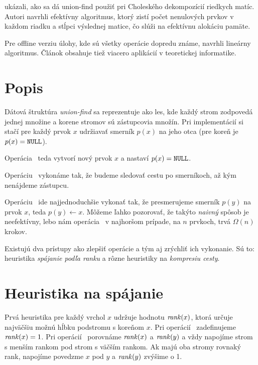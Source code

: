 \citet{cholesky} ukázali, ako sa dá union-find použiť pri Choleského dekompozícií
riedkych matíc. Autori navrhli efektívny algoritmus, ktorý zistí počet nenulových
prvkov v každom riadku a stĺpci výslednej matice, čo slúži na efektívnu alokáciu
pamäte.

Pre offline verziu úlohy, kde sú všetky operácie dopredu známe, \citet{offline-uf}
navrhli lineárny algoritmus. Článok obsahuje tiež viacero aplikácií v teoretickej
informatike.


\section{Popis}
Dátová štruktúra \emph{union-find} sa reprezentuje ako les, kde každý strom zodpovedá
jednej množine a korene stromov sú zástupcovia množín. Pri implementácií si
stačí pre každý prvok $x$ udržiavať smerník $p(x)$ na jeho otca
(pre koreň je $p(x)=\texttt{NULL}$).

Operácia \makeset\ teda vytvorí nový prvok $x$ a nastaví $p(x) = \texttt{NULL}$. 

Operáciu \find\ vykonáme tak, že budeme sledovať cestu po smerníkoch, až 
kým nenájdeme zástupcu. 

Operáciu \union\ ide najjednoduchšie vykonať tak, že presmerujeme smerník 
$p(y)$ na prvok $x$, teda $p(y) \gets x$. 
Môžeme ľahko pozorovať, že takýto \emph{naivný} spôsob je neefektívny, 
lebo nám operácia \find\ v najhoršom prípade, na $n$ prvkoch, trvá $\Omega(n)$ 
krokov. 

\smallskip
Existujú dva prístupy ako zlepšiť operácie a tým aj zrýchliť ich vykonanie. 
Sú to: heuristika \emph{spájanie podľa ranku} a rôzne heuristiky na 
\emph{kompresiu cesty}. 

\section{Heuristika na spájanie}

Prvá heuristika pre každý vrchol $x$ udržuje hodnotu $\mathop{\mathit{rank}}(x)$,
ktorá určuje najväčšiu možnú hĺbku podstromu s koreňom $x$.
Pri o\-pe\-rá\-cií \makeset\ zadefinujeme $\mathop{\mathit{rank}}(x) = 1$. 
Pri o\-pe\-rá\-cií \union\ porovnáme $\mathop{\mathit{rank}}(x)$ a $\mathop{\mathit{rank}}(y)$
a vždy napojíme strom s menším rankom pod strom s väčším rankom.
Ak majú oba stromy rovnaký rank, napojíme povedzme $x$ pod $y$
a $\mathop{\mathit{rank}}(y)$ zvýšime o 1.

